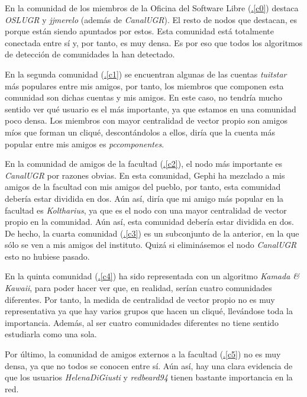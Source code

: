 \documentclass[10pt,a4paper,spanish]{article}
\numberwithin{equation}{section} %
\numberwithin{figure}{section} %
\numberwithin{table}{section} %
\begin{document}
En la comunidad de los miembros de la Oficina del Software Libre (\hyperref[c0]{\thesection .\ref*{c0}}) destaca \textit{OSLUGR} y \textit{jjmerelo} (además de \textit{CanalUGR}). El resto de nodos que destacan, es porque están siendo apuntados por estos. Esta comunidad está totalmente conectada entre sí y, por tanto, es muy densa. Es por eso que todos los algoritmos de detección de comunidades la han detectado. 

En la segunda comunidad (\hyperref[c1]{\thesection .\ref*{c1}}) se encuentran algunas de las cuentas \textit{tuitstar} más populares entre mis amigos, por tanto, los miembros que componen esta comunidad son dichas cuentas y mis amigos. En este caso, no tendría mucho sentido ver qué usuario es el más importante, ya que estamos en una comunidad poco densa. Los miembros con mayor centralidad de vector propio son amigos míos que forman un cliqué, descontándolos a ellos, diría que la cuenta más popular entre mis amigos es \textit{pccomponentes}.

En la comunidad de amigos de la facultad (\hyperref[c2]{\thesection .\ref*{c2}}), el nodo más importante es \textit{CanalUGR} por razones obvias. En esta comunidad, Gephi ha mezclado a mis amigos de la facultad con mis amigos del pueblo, por tanto, esta comunidad debería estar dividida en dos. Aún así, diría que mi amigo más popular en la facultad es \textit{Koltharius}, ya que es el nodo con una mayor centralidad de vector propio en la comunidad. Aún así, esta comunidad debería estar dividida en dos. De hecho, la cuarta comunidad (\hyperref[c3]{\thesection .\ref*{c3}}) es un subconjunto de la anterior, en la que sólo se ven a mis amigos del instituto. Quizá si eliminásemos el nodo \textit{CanalUGR} esto no hubiese pasado.

En la quinta comunidad (\hyperref[c4]{\thesection .\ref*{c4}}) ha sido representada con un algoritmo \textit{Kamada \& Kawaii}, para poder hacer ver que, en realidad, serían cuatro comunidades diferentes. Por tanto, la medida de centralidad de vector propio no es muy representativa ya que hay varios grupos que hacen un cliqué, llevándose toda la importancia. Además, al ser cuatro comunidades diferentes no tiene sentido estudiarla como una sola.

Por último, la comunidad de amigos externos a la facultad (\hyperref[c5]{\thesection .\ref*{c5}}) no es muy densa, ya que no todos se conocen entre sí. Aún así, hay una clara evidencia de que los usuarios \textit{HelenaDiGiusti} y \textit{redbeard94} tienen bastante importancia en la red.
\end{document}
